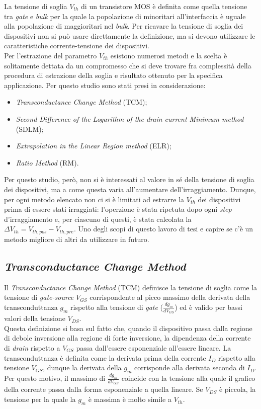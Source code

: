 La tensione di soglia $V_{th}$ di un transistore MOS è definita come quella tensione tra \emph{gate} e \emph{bulk} per la quale la popolazione di minoritari all'interfaccia è uguale alla popolazione di maggioritari nel \emph{bulk}. Per ricavare la tensione di soglia dei dispositivi non si può usare direttamente la definizione, ma si devono utilizzare le caratteristiche corrente-tensione dei dispositivi. \\
Per l'estrazione del parametro $V_{th}$ esistono numerosi metodi \cite{art2} e la scelta è solitamente dettata da un compromesso che si deve trovare fra complessità della procedura di estrazione della soglia e risultato ottenuto per la specifica applicazione. Per questo studio sono stati presi in considerazione:

\begin{itemize}
  \item \emph{Transconductance Change Method} (TCM);
  \item \emph{Second Difference of the Logarithm of the drain current Minimum method} (SDLM);
  \item \emph{Extrapolation in the Linear Region method} (ELR);
  \item \emph{Ratio Method} (RM).
\end{itemize}

Per questo studio, però, non si è interessati al valore in sé della tensione di soglia dei dispositivi, ma a come questa varia all'aumentare dell'irraggiamento. Dunque, per ogni metodo elencato non ci si è limitati ad estrarre la $V_{th}$ dei dispositivi prima di essere stati irraggiati: l'operzione è stata ripetuta dopo ogni \emph{step} d'irraggiamento e, per ciascuno di questi, è stata calcolata la $\Delta V_{th} = V_{th,pos}-V_{th,pre}$. Uno degli scopi di questo lavoro di tesi e capire se c'è un metodo migliore di altri da utilizzare in futuro.

\subsection[TCM]{\emph{Transconductance Change Method}}
Il \emph{Transconductance Change Method} (TCM) definisce la tensione di soglia come la tensione di \emph{gate-source} $V_{GS}$ corrispondente al picco massimo della derivata della transconduttanza $g_m$ rispetto alla tensione di \emph{gate} ($\frac{dg_m}{dV_ {GS}}$) ed è valido per bassi valori della tensione $V_{DS}$.\\
Questa definizione si basa sul fatto che, quando il dispositivo passa dalla regione di debole inversione alla regione di forte inversione, la dipendenza della corrente di \emph{drain} rispetto a $V_{GS}$ passa dall'essere esponenziale all'essere lineare.
La transconduttanza è definita come la derivata prima della corrente $I_D$ rispetto alla tensione $V_{GS}$, dunque la derivata della $g_m$ corrisponde alla derivata seconda di $I_D$. Per questo motivo, il massimo di $\frac{dg_m}{dV_{GS}}$ coincide con la tensione alla quale il grafico della corrente passa dalla forma esponenziale a quella lineare. Se $V_{DS}$ è piccola, la tensione per la quale la $g_m$ è massima è molto simile a $V_{th}$.

